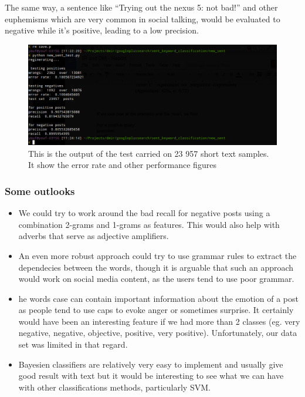 The same way, a sentence like “Trying out the nexus 5: not bad!” and other euphemisms which are very common in social talking, would be 
evaluated to negative while it’s positive, leading to a low precision.

\begin{figure}[h]
\centering
\includegraphics[scale=.4]{images/sent2.png}
\caption{This is the output of the test carried on 23 957 short text samples. It show the error rate and other performance figures}
\end{figure}



\subsubsection*{Some outlooks}
\begin{itemize}
 \item 
 We could try to work around the bad recall for negative posts using a combination 2-grams and 1-grams as features. This would also help with adverbs that serve as adjective amplifiers.
\item 
An even more robust approach could try to use grammar rules to extract the dependecies between the words, though it is arguable that such an approach would work on social media content, as the users tend to use poor grammar. 
\item 
he words case can contain important information about the emotion of a post as people tend to use caps to evoke anger or sometimes surprise. It certainly would have been an interesting feature if we had more than 2 classes (eg. very negative, negative, objective, positive, very positive). Unfortunately, our data set was limited in that regard.
\item 
Bayesien classifiers are relatively very easy to implement and usually give good result with text but it would be interesting to see what we can have with other classifications methods, particularly SVM. 

\end{itemize}

